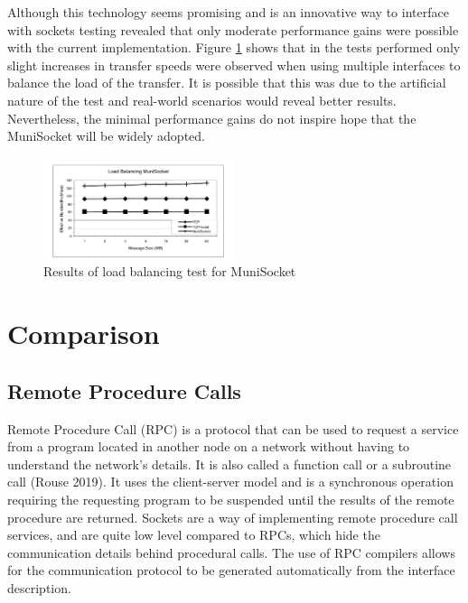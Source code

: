 \documentclass[conference, 12pt]{IEEEtran}
\begin{document}
Although this technology seems promising and is an innovative way to interface with sockets testing revealed that only moderate performance gains were possible with the current implementation. Figure \ref{Figure5} shows that in the tests performed only slight increases in transfer speeds were observed when using multiple interfaces to balance the load of the transfer. It is possible that this was due to the artificial nature of the test and real-world scenarios would reveal better results. Nevertheless, the minimal performance gains do not inspire hope that the MuniSocket will be widely adopted.

\begin{figure}[!h]
    \centering
    \centerline{\includegraphics[width=0.5\textwidth]{Figure5.png}}
    \caption{Results of load balancing test for MuniSocket \cite{Mohamed}}
    \label{Figure5}
\end{figure}

\section{Comparison}
\subsection{Remote Procedure Calls}
Remote Procedure Call (RPC) is a protocol that can be used to request a service from a program located in another node on a network without having to understand the network’s details. It is also called a function call or a subroutine call (Rouse 2019). It uses the client-server model and is a synchronous operation requiring the requesting program to be suspended until the results of the remote procedure are returned. Sockets are a way of implementing remote procedure call services, and are quite low level compared to RPCs, which hide the communication details behind procedural calls. The use of RPC compilers allows for the communication protocol to be generated automatically from the interface description.
\end{document}
